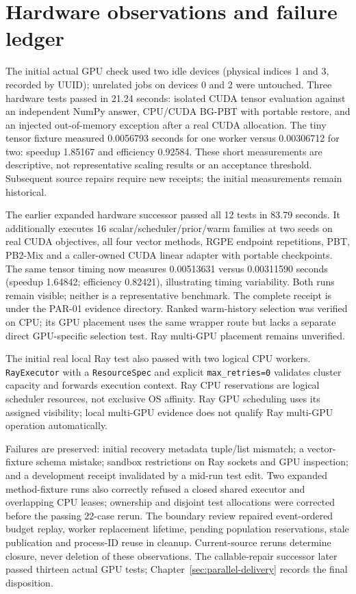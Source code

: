 \section{Hardware observations and failure ledger}
The initial actual GPU check used two idle devices (physical indices 1 and 3,
recorded by UUID); unrelated jobs on devices 0 and 2 were untouched. Three
hardware tests passed in 21.24 seconds: isolated CUDA tensor evaluation against
an independent NumPy answer, CPU/CUDA BG-PBT with portable restore, and an
injected out-of-memory exception after a real CUDA allocation. The tiny tensor
fixture measured 0.0056793 seconds for one worker versus 0.00306712 for two:
speedup 1.85167 and efficiency 0.92584. These short measurements are descriptive,
not representative scaling results or an acceptance threshold. Subsequent
source repairs require new receipts; the initial measurements remain historical.

The earlier expanded hardware successor passed all 12 tests in 83.79 seconds.
It additionally executes 16 scalar/scheduler/prior/warm families at two seeds
on real CUDA objectives, all four vector methods, RGPE endpoint repetitions,
PBT, PB2-Mix and a caller-owned CUDA linear adapter with portable checkpoints.
The same tensor timing now measures 0.00513631 versus 0.00311590 seconds
(speedup 1.64842; efficiency 0.82421), illustrating timing variability. Both
runs remain visible; neither is a representative benchmark. The complete
receipt is  under the
PAR-01 evidence directory. Ranked warm-history selection was verified on CPU;
its GPU placement uses the same wrapper route but lacks a separate direct
GPU-specific selection test. Ray multi-GPU placement remains unverified.

The initial real local Ray test also passed with two logical CPU workers.
\texttt{RayExecutor} with a \texttt{ResourceSpec} and explicit \texttt{max\_retries=0} validates
cluster capacity and forwards execution context. Ray CPU reservations are
logical scheduler resources, not exclusive OS affinity. Ray GPU scheduling
uses its assigned visibility; local multi-GPU evidence does not qualify Ray
multi-GPU operation automatically.

Failures are preserved: initial recovery metadata tuple/list mismatch;
a vector-fixture schema mistake; sandbox restrictions on Ray sockets and GPU
inspection; and a development receipt invalidated by a mid-run test edit. Two expanded method-fixture runs also correctly refused a closed shared executor and overlapping CPU leases; ownership and disjoint test allocations were corrected before the passing 22-case rerun.
The boundary review repaired event-ordered budget replay, worker replacement
lifetime, pending population reservations, stale publication and process-ID
reuse in cleanup. Current-source reruns determine closure, never deletion of
these observations. The callable-repair successor later passed thirteen actual
GPU tests; Chapter~\ref{sec:parallel-delivery} records the final disposition.

